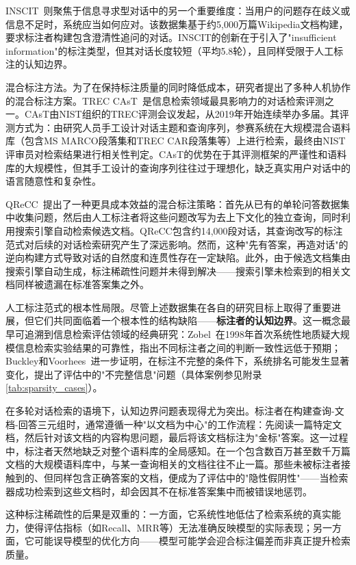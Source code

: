 INSCIT~\citep{wu-etal-2023-inscit}则聚焦于信息寻求型对话中的另一个重要维度：当用户的问题存在歧义或信息不足时，系统应当如何应对。该数据集基于约5,000万篇Wikipedia文档构建，要求标注者构建包含澄清性追问的对话。INSCIT的创新在于引入了"insufficient information"的标注类型，但其对话长度较短（平均5.8轮），且同样受限于人工标注的认知边界。

混合标注方法。为了在保持标注质量的同时降低成本，研究者提出了多种人机协作的混合标注方案。TREC CAsT~\citep{dalton2020treccast2019conversational}是信息检索领域最具影响力的对话检索评测之一。CAsT由NIST组织的TREC评测会议发起，从2019年开始连续举办多届。其评测方式为：由研究人员手工设计对话主题和查询序列，参赛系统在大规模混合语料库（包含MS MARCO段落集和TREC CAR段落集等）上进行检索，最终由NIST评审员对检索结果进行相关性判定。CAsT的优势在于其评测框架的严谨性和语料库的大规模性，但其手工设计的查询序列往往过于理想化，缺乏真实用户对话中的语言随意性和复杂性。

QReCC~\citep{anantha-etal-2021-qrecc}提出了一种更具成本效益的混合标注策略：首先从已有的单轮问答数据集中收集问题，然后由人工标注者将这些问题改写为去上下文化的独立查询，同时利用搜索引擎自动检索候选文档。QReCC包含约14,000段对话，其查询改写的标注范式对后续的对话检索研究产生了深远影响。然而，这种"先有答案，再造对话"的逆向构建方式导致对话的自然度和连贯性存在一定缺陷。此外，由于候选文档集由搜索引擎自动生成，标注稀疏性问题并未得到解决——搜索引擎未检索到的相关文档同样被遗漏在标准答案集之外。

人工标注范式的根本性局限。尽管上述数据集在各自的研究目标上取得了重要进展，但它们共同面临着一个根本性的结构缺陷——\textbf{标注者的认知边界}。这一概念最早可追溯到信息检索评估领域的经典研究：Zobel~\citep{zobel1998reliable}在1998年首次系统性地质疑大规模信息检索实验结果的可靠性，指出不同标注者之间的判断一致性远低于预期；Buckley和Voorhees~\citep{buckley2004retrieval}进一步证明，在标注不完整的条件下，系统排名可能发生显著变化，提出了评估中的"不完整信息"问题（具体案例参见附录\ref{tab:sparsity_cases}）。

在多轮对话检索的语境下，认知边界问题表现得尤为突出。标注者在构建查询-文档-回答三元组时，通常遵循一种"以文档为中心"的工作流程：先阅读一篇特定文档，然后针对该文档的内容构思问题，最后将该文档标注为"金标"答案。这一过程中，标注者天然地缺乏对整个语料库的全局感知。在一个包含数百万甚至数千万篇文档的大规模语料库中，与某一查询相关的文档往往不止一篇。那些未被标注者接触到的、但同样包含正确答案的文档，便成为了评估中的"隐性假阴性"——当检索器成功检索到这些文档时，却会因其不在标准答案集中而被错误地惩罚。

这种标注稀疏性的后果是双重的：一方面，它系统性地低估了检索系统的真实能力，使得评估指标（如Recall、MRR等）无法准确反映模型的实际表现；另一方面，它可能误导模型的优化方向——模型可能学会迎合标注偏差而非真正提升检索质量。

